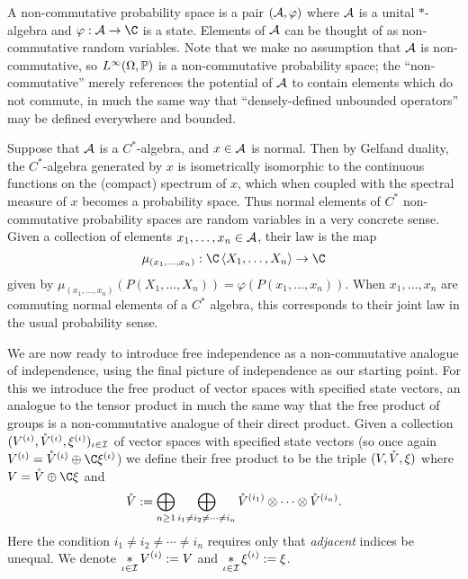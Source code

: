 A non-commutative probability space is a pair $(\A, \varphi)$ where $\A$ is a unital $*$-algebra and $\varphi : \A \to \C$ is a state.
Elements of $\A$ can be thought of as non-commutative random variables.
Note that we make no assumption that $\A$ is non-commutative, so $L^\infty(\Omega, \P)$ is a non-commutative probability space; the ``non-commutative'' merely references the potential of $\A$ to contain elements which do not commute, in much the same way that ``densely-defined unbounded operators'' may be defined everywhere and bounded.

Suppose that $\A$ is a $C^*$-algebra, and $x \in \A$ is normal.
Then by Gelfand duality, the $C^*$-algebra generated by $x$ is isometrically isomorphic to the continuous functions on the (compact) spectrum of $x$, which when coupled with the spectral measure of $x$ becomes a probability space.
Thus normal elements of $C^*$ non-commutative probability spaces are random variables in a very concrete sense.
Given a collection of elements $x_1, \ldots, x_n \in \A$, their law is the map
$$\mu_{(x_1, \ldots, x_n)} : \C\ang{X_1, \ldots, X_n} \to \C$$
given by $\mu_{(x_1, \ldots, x_n)}(P(X_1, \ldots, X_n)) = \varphi(P(x_1, \ldots, x_n))$.
When $x_1, \ldots, x_n$ are commuting normal elements of a $C^*$ algebra, this corresponds to their joint law in the usual probability sense.

We are now ready to introduce free independence as a non-commutative analogue of independence, using the final picture of independence as our starting point.
For this we introduce the free product of vector spaces with specified state vectors, an analogue to the tensor product in much the same way that the free product of groups is a non-commutative analogue of their direct product.
Given a collection $(V^{(\iota)}, \oV^{(\iota)}, \xi^{(\iota)})_{\iota\in\I}$ of vector spaces with specified state vectors (so once again $V^{(\iota)} = \oV^{(\iota)}\oplus\C\xi^{(\iota)}$) we define their free product to be the triple $(V, \oV, \xi)$ where $V = \oV\oplus\C\xi$ and
$$\oV := \bigoplus_{n \geq 1}\bigoplus_{i_1\neq i_2 \neq \cdots \neq i_n} \oV^{(i_1)} \otimes \cdots \otimes \oV^{(i_n)}.$$
Here the condition $i_1\neq i_2\neq \cdots \neq i_n$ requires only that \emph{adjacent} indices be unequal.
We denote $\displaystyle\st_{\iota\in\I}V^{(\iota)} := V$ and $\displaystyle\st_{\iota\in\I}\xi^{(\iota)} := \xi$.

